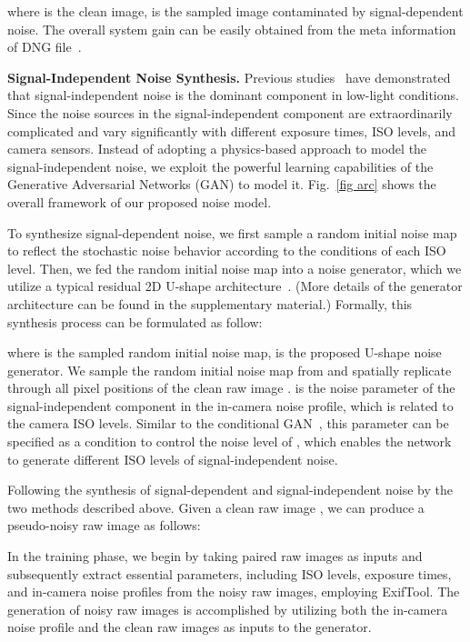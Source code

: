 \documentclass[10pt,twocolumn,letterpaper]{article}
\begin{document}
\noindent where  is the clean image,  is the sampled image contaminated by signal-dependent noise. The overall system gain  can be easily obtained from the meta information of DNG file~\cite{adobe2012}.

\textbf{Signal-Independent Noise Synthesis.} Previous studies~\cite{wei2020physics, zhang2021rethinking} have demonstrated that signal-independent noise is the dominant component in low-light conditions. Since the noise sources in the signal-independent component are extraordinarily complicated and vary significantly with different exposure times, ISO levels, and camera sensors. Instead of adopting a physics-based approach to model the signal-independent noise, we exploit the powerful learning capabilities of the Generative Adversarial Networks (GAN) to model it. Fig.~\ref{fig arc} shows the overall framework of our proposed noise model.

To synthesize signal-dependent noise, we first sample a random initial noise map to reflect the stochastic noise behavior according to the conditions of each ISO level. Then, we fed the random initial noise map into a noise generator, which we utilize a typical residual 2D U-shape architecture~\cite{ronneberger2015u}. (More details of the generator architecture can be found in the supplementary material.) Formally, this synthesis process can be formulated as follow:

\noindent where  is the sampled random initial noise map,  is the proposed U-shape noise generator. We sample the random initial noise map from  and spatially replicate through all pixel positions of the clean raw image .  is the noise parameter of the signal-independent component in the in-camera noise profile, which is related to the camera ISO levels. Similar to the conditional GAN~\cite{mirza2014conditional}, this parameter can be specified as a condition to control the noise level of , which enables the network to generate different ISO levels of signal-independent noise.

Following the synthesis of signal-dependent and signal-independent noise by the two methods described above. Given a clean raw image , we can produce a pseudo-noisy raw image  as follows:


In the training phase, we begin by taking paired raw images as inputs and subsequently extract essential parameters, including ISO levels, exposure times, and in-camera noise profiles from the noisy raw images, employing ExifTool. The generation of noisy raw images is accomplished by utilizing both the in-camera noise profile and the clean raw images as inputs to the generator.
\end{document}
